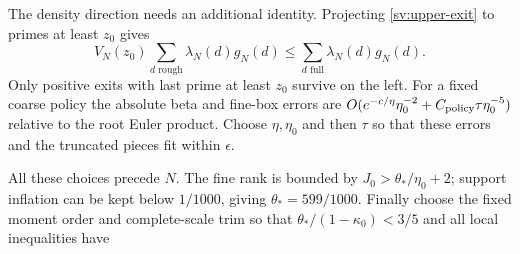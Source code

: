 The density direction needs an additional identity.  Projecting
\eqref{sv:upper-exit} to primes at least $z_0$ gives
\begin{equation}\label{sv:upper-projection}
 V_N(z_0)\sum_{d\text{ rough}}\lambda_N(d)g_N(d)
       \le\sum_{d\text{ full}}\lambda_N(d)g_N(d).
\end{equation}
Only positive exits with last prime at least $z_0$ survive on the
left.  For a fixed coarse policy the absolute beta and fine-box
errors are
$O(e^{-c/\eta}\eta_0^{-2}+C_{\rm policy}\tau\eta_0^{-5})$
relative to the root Euler product.  Choose $\eta,\eta_0$ and
then $\tau$ so that these errors and the truncated pieces fit
within $\epsilon$.

All these choices precede $N$.  The fine rank is bounded by
$J_0>\theta_*/\eta_0+2$; support inflation can be kept below
$1/1000$, giving $\theta_*=599/1000$.
Finally choose the fixed moment order and complete-scale trim so
that $\theta_*/(1-\kappa_0)<3/5$ and all local inequalities have
